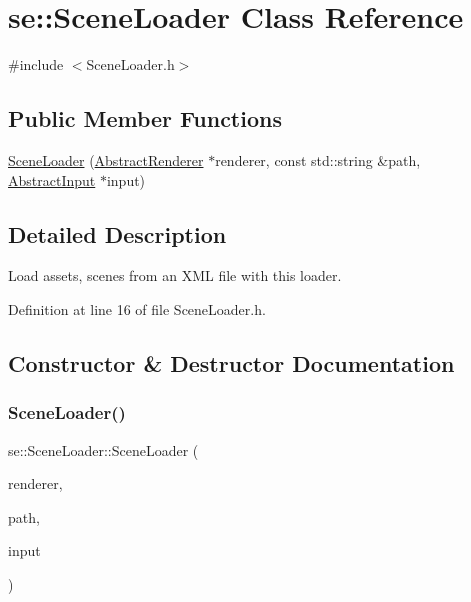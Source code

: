 \hypertarget{classse_1_1_scene_loader}{}\section{se\+:\+:Scene\+Loader Class Reference}
\label{classse_1_1_scene_loader}


{\ttfamily \#include $<$Scene\+Loader.\+h$>$}

\subsection*{Public Member Functions}
\begin{DoxyCompactItemize}
\item 
\mbox{\hyperlink{classse_1_1_scene_loader_a330e5c0d025a64e8386ad9d994f2dbad}{Scene\+Loader}} (\mbox{\hyperlink{classse_1_1_abstract_renderer}{Abstract\+Renderer}} $\ast$renderer, const std\+::string \&path, \mbox{\hyperlink{classse_1_1_abstract_input}{Abstract\+Input}} $\ast$input)
\end{DoxyCompactItemize}


\subsection{Detailed Description}
Load assets, scenes from an X\+ML file with this loader. 

Definition at line 16 of file Scene\+Loader.\+h.



\subsection{Constructor \& Destructor Documentation}
\mbox{\label{classse_1_1_scene_loader_a330e5c0d025a64e8386ad9d994f2dbad}} 
\subsubsection{\texorpdfstring{Scene\+Loader()}{SceneLoader()}}
{\footnotesize\ttfamily se\+::\+Scene\+Loader\+::\+Scene\+Loader (\begin{DoxyParamCaption}\item[{\mbox{\hyperlink{classse_1_1_abstract_renderer}{Abstract\+Renderer}} $\ast$}]{renderer,  }\item[{const std\+::string \&}]{path,  }\item[{\mbox{\hyperlink{classse_1_1_abstract_input}{Abstract\+Input}} $\ast$}]{input }\end{DoxyParamCaption})}

